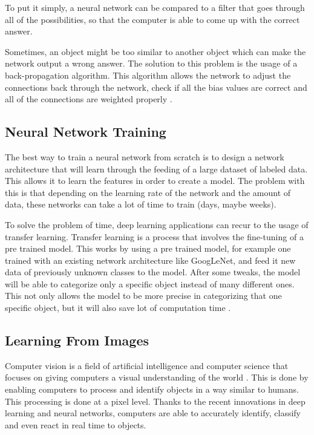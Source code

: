     
   
    \par To put it simply, a neural network can be compared to a filter that goes through all of the possibilities, so that the computer is able to come up with the correct answer.
    \par Sometimes, an object might be too similar to another object which can make the network output a wrong answer. The solution to this problem is the usage of a back-propagation algorithm. This algorithm allows the network to adjust the connections back through the network, check if all the bias values are correct and all of the connections are weighted properly \cite{ArmaanMerchant2018}.
    


    \subsection{Neural Network Training}
    \par The best way to train a neural network from scratch is to design a network architecture that will learn through the feeding of a large dataset of labeled data. This allows it to learn the features in order to create a model. The problem with this is that depending on the learning rate of the network and the amount of data, these networks can take a lot of time to train (days, maybe weeks). 

    \par To solve the problem of time, deep learning applications can recur to the usage of transfer learning. Transfer learning is a process that involves the fine-tuning of a pre trained model. This works by using a pre trained model, for example one trained with an existing network architecture like GoogLeNet, and feed it new data of previously unknown classes to the model. After some tweaks, the model will be able to categorize only a specific object instead of many different ones. This not only allows the model to be more precise in categorizing that one specific object, but it will also save lot of computation time \cite{mathworks_deeplearning}.


     
    \subsection{Learning From Images}
    \par Computer vision is a field of artificial intelligence and computer science that focuses on giving computers a visual understanding of the world \cite{cv} \cite{cv2}. This is done by enabling computers to process and identify objects in a way similar to humans. This processing is done at a pixel level.
    Thanks to the recent innovations in deep learning and neural networks, computers are able to accurately identify, classify and even react in real time to objects. 


